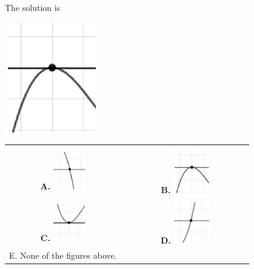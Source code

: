 \documentclass{extbook}[14pt]
\begin{document}
 
 The solution is  
 \begin{center} \includegraphics[width=0.3\textwidth]{../Figures/polyZeroBehaviorBB.png} \end{center}\begin{tabular}{|c|c|} 
\hline 
 & \tabularnewline 
 \textbf{A.} \includegraphics[width=0.3\textwidth]{../Figures/polyZeroBehaviorAB.png} & \textbf{B.} \includegraphics[width=0.3\textwidth]{../Figures/polyZeroBehaviorBB.png} \tabularnewline 
\hline 
 & \tabularnewline 
 \textbf{C.} \includegraphics[width=0.3\textwidth]{../Figures/polyZeroBehaviorCB.png} & \textbf{D.} \includegraphics[width=0.3\textwidth]{../Figures/polyZeroBehaviorDB.png} \tabularnewline 
\hline 
 E. None of the figures above. & \tabularnewline 
\hline 
 \end{tabular} 
 
\end{document}
